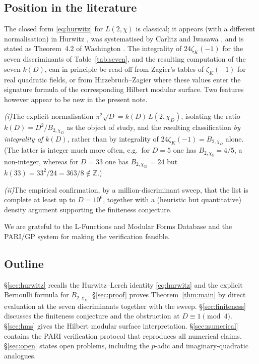\documentclass[11pt,reqno]{amsart}
\theoremstyle{plain}
\theoremstyle{definition}
\newcommand{\Z}{\mathbb{Z}}
\begin{document}
\subsection{Position in the literature}
The closed form \eqref{eq:hurwitz} for $L(2,\chi)$ is classical; it
appears (with a different normalisation) in
Hurwitz \cite{Hurwitz1882}, was systematised by Carlitz
\cite{Carlitz1959} and Iwasawa \cite{Iwasawa1972}, and is stated as
Theorem~4.2 of Washington \cite{Washington1997}.  The integrality of
$24\zeta_{K}(-1)$ for the seven discriminants of
Table~\ref{tab:seven}, and the resulting computation of the seven
$k(D)$, can in principle be read off from Zagier's tables
\cite{Zagier1976} of $\zeta_{K}(-1)$ for real quadratic fields, or
from Hirzebruch--Zagier \cite{HirzebruchZagier1976} where these
values enter the signature formula of the corresponding Hilbert
modular surface.  Two features however appear to be new in the
present note.

\smallskip
\noindent\emph{(i)}\quad The explicit normalisation
$\pi^{2}\sqrt{D}=k(D)\,L(2,\chi_{D})$, isolating the ratio
$k(D)=D^{2}/B_{2,\chi_{D}}$ as the object of study, and the resulting
classification \emph{by integrality of $k(D)$}, rather than by
integrality of $24\zeta_{K}(-1)=B_{2,\chi_{D}}$ alone.  (The latter
is integer much more often, e.g.\ for $D=5$ one has
$B_{2,\chi_{5}}=4/5$, a non-integer, whereas for $D=33$ one has
$B_{2,\chi_{33}}=24$ but $k(33)=33^{2}/24=363/8\notin\Z$.)

\smallskip
\noindent\emph{(ii)}\quad The empirical confirmation, by a
million-discriminant sweep, that the list is complete at least up to
$D=10^{6}$, together with a (heuristic but quantitative) density
argument supporting the finiteness conjecture.

\smallskip
We are grateful to the L-Functions and Modular Forms Database
\cite{LMFDB} and the PARI/GP system \cite{PARI} for making the
verification feasible.

\subsection{Outline}
\S\ref{sec:hurwitz} recalls the Hurwitz--Lerch identity
\eqref{eq:hurwitz} and the explicit Bernoulli formula for
$B_{2,\chi_{D}}$.  \S\ref{sec:proof} proves Theorem~\ref{thm:main} by
direct evaluation at the seven discriminants together with the
sweep.  \S\ref{sec:finiteness} discusses the finiteness conjecture
and the obstruction at $D\equiv 1\pmod 4$.  \S\ref{sec:hms} gives
the Hilbert modular surface interpretation.  \S\ref{sec:numerical}
contains the PARI verification protocol that reproduces all numerical
claims.  \S\ref{sec:open} states open problems, including the
$p$-adic and imaginary-quadratic analogues.
\end{document}
